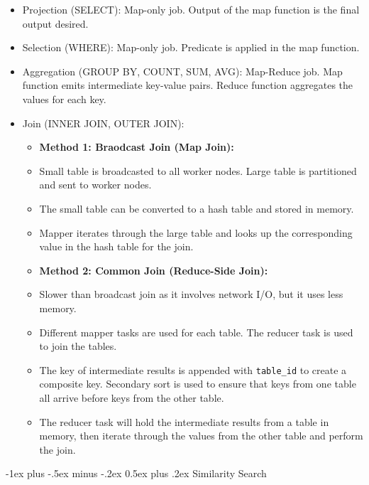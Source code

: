 \documentclass[10pt, landscape]{article}
\makeatletter
\renewcommand{\section}{\@startsection{section}{1}{0mm}%
  {-1ex plus -.5ex minus -.2ex}%
  {0.5ex plus .2ex}%
{\normalfont\large\bfseries}}
\makeatother
\begin{document}
\begin{multicols*}{4}
  \begin{itemize}
    \item Projection (SELECT): Map-only job. Output of the map function is the final output desired.
    \item Selection (WHERE): Map-only job. Predicate is applied in the map function.
    \item Aggregation (GROUP BY, COUNT, SUM, AVG): Map-Reduce job. Map function emits intermediate key-value pairs. Reduce function aggregates the values for each key.
    \item Join (INNER JOIN, OUTER JOIN):
      \begin{itemize}
        \item \textbf{Method 1: Braodcast Join (Map Join):}
        \item Small table is broadcasted to all worker nodes. Large table is partitioned and sent to worker nodes.
        \item The small table can be converted to a hash table and stored in memory.
        \item Mapper iterates through the large table and looks up the corresponding value in the hash table for the join.
        \item \textbf{Method 2: Common Join (Reduce-Side Join):}
        \item Slower than broadcast join as it involves network I/O, but it uses less memory.
        \item Different mapper tasks are used for each table. The reducer task is used to join the tables.
        \item The key of intermediate results is appended with \texttt{table\_id} to create a composite key. Secondary sort is used to ensure that keys from one table all arrive before keys from the other table.
        \item The reducer task will hold the intermediate results from a table in memory, then iterate through the values from the other table and perform the join.
      \end{itemize}
  \end{itemize}

  \section{Similarity Search}


\end{multicols*}
\end{document}
